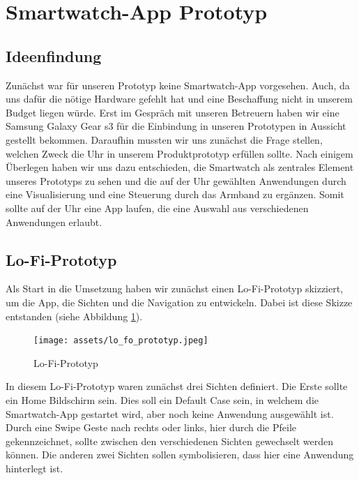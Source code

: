 \documentclass[11pt, a4paper]{article}
\begin{document}
\newpage

\section{Smartwatch-App Prototyp}

\subsection{Ideenfindung}

Zunächst war für unseren Prototyp keine Smartwatch-App vorgesehen. Auch, da uns dafür die nötige Hardware gefehlt hat und eine Beschaffung nicht in unserem Budget liegen würde. Erst im Gespräch mit unseren Betreuern haben wir eine Samsung Galaxy Gear s3 für die Einbindung in unseren Prototypen in Aussicht gestellt bekommen. Daraufhin mussten wir uns zunächst die Frage stellen, welchen Zweck die Uhr in unserem Produktprototyp erfüllen sollte. Nach einigem Überlegen haben wir uns dazu entschieden, die Smartwatch als zentrales Element unseres Prototyps zu sehen und die auf der Uhr gewählten Anwendungen durch eine Visualisierung und eine Steuerung durch das Armband zu ergänzen. Somit sollte auf der Uhr eine App laufen, die eine Auswahl aus verschiedenen Anwendungen erlaubt. 

\subsection{Lo-Fi-Prototyp}

Als Start in die Umsetzung haben wir zunächst einen Lo-Fi-Prototyp skizziert, um die App, die Sichten und die Navigation zu entwickeln. Dabei ist diese Skizze entstanden (siehe Abbildung \ref{fig:Smatwatch_Prototyp}).

\begin{figure}[h]
	\centering
	\texttt{[image: assets/lo\_fo\_prototyp.jpeg]}
	\caption{Lo-Fi-Prototyp}
	\label{fig:Smatwatch_Prototyp}
\end{figure}

In diesem Lo-Fi-Prototyp waren zunächst drei Sichten definiert. Die Erste sollte ein Home Bildschirm sein. Dies soll ein Default Case sein, in welchem die Smartwatch-App gestartet wird, aber noch keine Anwendung ausgewählt ist. Durch eine Swipe Geste nach rechts oder links, hier durch die Pfeile gekennzeichnet, sollte zwischen den verschiedenen Sichten gewechselt werden können. Die anderen zwei Sichten sollen symbolisieren, dass hier eine Anwendung hinterlegt ist. 
\end{document}
